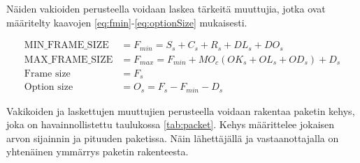 \documentclass[a4paper,12pt]{article}
\begin{document}
    Näiden vakioiden perusteella voidaan laskea tärkeitä muuttujia, jotka ovat määritelty kaavojen \ref{eq:fmin}-\ref{eq:optionSize} mukaisesti.

    \begin{align}
        \text{MIN\_FRAME\_SIZE} &= F_{min} = S_s + C_s + R_s + DL_s + DO_s \label{eq:fmin} \\
        \text{MAX\_FRAME\_SIZE} &= F_{max} = F_{min} + MO_c(OK_s + OL_s + OD_s) + D_s \label{eq:fmax} \\
        \text{Frame size} &= F_s \\
        \text{Option size} &= O_s = F_s - F_{min} - D_s \label{eq:optionSize}
    \end{align}

    Vakikoiden ja laskettujen muuttujien perusteella voidaan rakentaa paketin kehys, joka on havainnollistettu taulukossa \ref{tab:packet}.
    Kehys määrittelee jokaisen arvon sijainnin ja pituuden paketissa. Näin lähettäjällä ja vastaanottajalla on yhtenäinen ymmärrys paketin rakenteesta.

    \begin{table}[h!]
        \
        \centering
        \caption{Paketin rakenne}
        \label{tab:packet}
    \end{table}
\end{document}
